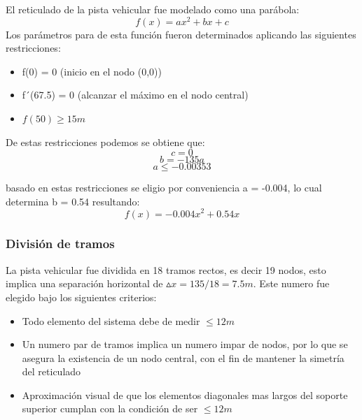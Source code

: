 \documentclass[]{article}
\begin{document}
	El reticulado de la pista vehicular fue modelado como una parábola:
	\begin{equation}
		f(x) = ax^2 + bx + c
	\end{equation}
	Los parámetros para de esta función fueron determinados aplicando las siguientes restricciones:
	\begin{itemize}
		\item f(0) = 0 (inicio en el nodo (0,0))
		\item f´(67.5) = 0 (alcanzar el máximo en el nodo central)
		\item $f(50)\geq 15m $ 
	\end{itemize}
	De estas restricciones podemos se obtiene que:
	\begin{equation}
		c = 0
	\end{equation}
	\begin{equation}
		b = -135a
	\end{equation}
	\begin{equation}
		a\leq -0.00353
	\end{equation}
	
	basado en estas restricciones se eligio por conveniencia a = -0.004, lo cual determina b = 0.54 resultando:
	\begin{equation}
		f(x) = -0.004x^2 + 0.54x
	\end{equation}
	
	\subsubsection{División de tramos}
	La pista vehicular fue dividida en 18 tramos rectos, es decir 19 nodos, esto implica una separación horizontal de $\vartriangle{x} = 135/18 = 7.5 m$. Este numero fue elegido bajo los siguientes criterios:
	\begin{itemize}
		\item Todo elemento del sistema debe de medir $\leq 12 m$
		\item Un numero par de tramos implica un numero impar de nodos, por lo que se asegura la existencia de un nodo central, con el fin de mantener la simetría del reticulado
		\item Aproximación visual de que los elementos diagonales mas largos del soporte superior cumplan con la condición de ser $\leq 12m$
	\end{itemize}
	
\end{document}
